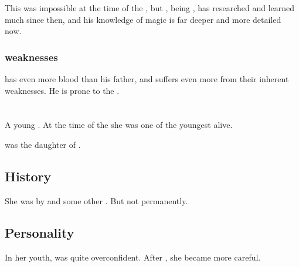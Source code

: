 This was impossible at the time of the \SecondShrouding{}, but \Secherdamon, being , has researched and learned much since then, and his knowledge of magic is far deeper and more detailed now.





\subsubsection{\XzaiShannic{} weaknesses}
\Vizsherioch{} has even more \xsic{} blood than his father, and suffers even more from their inherent weaknesses. 
He is prone to the . 















\section{\Zessuruch}
\index{\Zessuruch}
A young \dragon. 
At the time of the \thirdbanewar{} she was one of the youngest \dragons alive. 

\Zessuruch was the daughter of \Thessulax. 









\subsection{History}
She was  by  and some other \resphain. 
But not permanently. 









\subsection{Personality}
In her youth, \Zessuruch was quite overconfident. 
After , she became more careful. 























